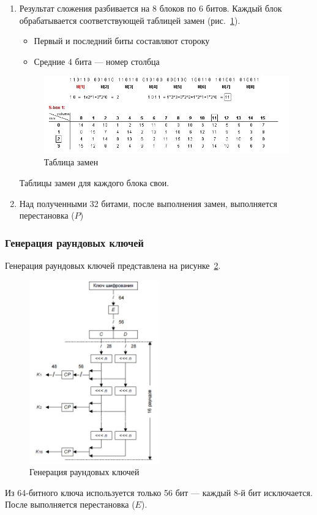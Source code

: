 \documentclass[a4paper, 14pt]{extarticle}
\begin{document}
\begin{enumerate}
    \item Результат сложения разбивается на 8 блоков по 6 битов. Каждый блок обрабатывается соответствующей таблицей замен (рис.~\ref{img:1:3_2}).
    \begin{itemize}
        \item Первый и последний биты составляют стороку
        \item Средние 4 бита --- номер столбца\\
    \end{itemize}
    \begin{figure}[h]
        \centering
        \includegraphics[width=\textwidth]{./img/S008.jpg}
        \caption{Таблица замен}%
        \label{img:1:3_2}
    \end{figure}

    Таблицы замен для каждого блока свои.

    \item Над полученными 32 битами, после выполнения замен, выполняется перестановка ($P$)
\end{enumerate}

\subsubsection{Генерация раундовых ключей}
Генерация раундовых ключей представлена на рисунке~\ref{img:1:4}.
\begin{figure}[h]
    \centering
    \includegraphics[width=0.5\textwidth]{./img/S004.jpg}
    \caption{Генерация раундовых ключей}%
    \label{img:1:4}
\end{figure}
Из 64-битного ключа используется только 56 бит --- каждый 8-й бит исключается. После выполняется перестановка ($E$).
\end{document}
